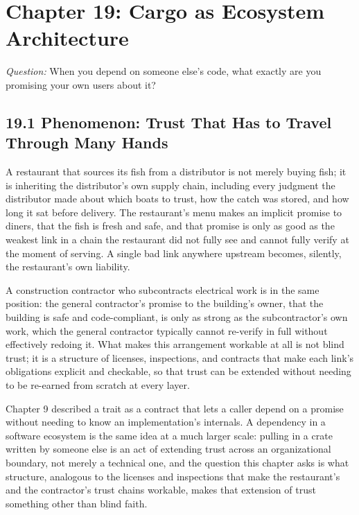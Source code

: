 \documentclass[11pt]{book}
\begin{document}
\clearpage

\chapter*{Chapter 19: Cargo as Ecosystem Architecture}

\begin{firstprinciples}
\textit{Question:} When you depend on someone else's code, what exactly are you promising your own users about it?
\end{firstprinciples}

\section*{19.1 Phenomenon: Trust That Has to Travel Through Many Hands}

A restaurant that sources its fish from a distributor is not merely buying fish; it is inheriting the distributor's own supply chain, including every judgment the distributor made about which boats to trust, how the catch was stored, and how long it sat before delivery. The restaurant's menu makes an implicit promise to diners, that the fish is fresh and safe, and that promise is only as good as the weakest link in a chain the restaurant did not fully see and cannot fully verify at the moment of serving. A single bad link anywhere upstream becomes, silently, the restaurant's own liability.

A construction contractor who subcontracts electrical work is in the same position: the general contractor's promise to the building's owner, that the building is safe and code-compliant, is only as strong as the subcontractor's own work, which the general contractor typically cannot re-verify in full without effectively redoing it. What makes this arrangement workable at all is not blind trust; it is a structure of licenses, inspections, and contracts that make each link's obligations explicit and checkable, so that trust can be extended without needing to be re-earned from scratch at every layer.

Chapter 9 described a trait as a contract that lets a caller depend on a promise without needing to know an implementation's internals. A dependency in a software ecosystem is the same idea at a much larger scale: pulling in a crate written by someone else is an act of extending trust across an organizational boundary, not merely a technical one, and the question this chapter asks is what structure, analogous to the licenses and inspections that make the restaurant's and the contractor's trust chains workable, makes that extension of trust something other than blind faith.
\end{document}
